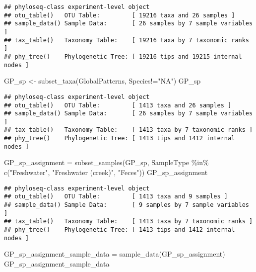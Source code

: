 \documentclass[
]{article}
\newenvironment{Shaded}{\begin{snugshade}}{\end{snugshade}}
\newcommand{\FunctionTok}[1]{\textcolor[rgb]{0.00,0.00,0.00}{#1}}
\newcommand{\NormalTok}[1]{#1}
\newcommand{\OtherTok}[1]{\textcolor[rgb]{0.56,0.35,0.01}{#1}}
\newcommand{\SpecialCharTok}[1]{\textcolor[rgb]{0.00,0.00,0.00}{#1}}
\newcommand{\StringTok}[1]{\textcolor[rgb]{0.31,0.60,0.02}{#1}}
\begin{document}
\begin{verbatim}
## phyloseq-class experiment-level object
## otu_table()   OTU Table:         [ 19216 taxa and 26 samples ]
## sample_data() Sample Data:       [ 26 samples by 7 sample variables ]
## tax_table()   Taxonomy Table:    [ 19216 taxa by 7 taxonomic ranks ]
## phy_tree()    Phylogenetic Tree: [ 19216 tips and 19215 internal nodes ]
\end{verbatim}

\begin{Shaded}
\begin{Highlighting}[]
\NormalTok{GP\_sp }\OtherTok{\textless{}{-}} \FunctionTok{subset\_taxa}\NormalTok{(GlobalPatterns, Species}\SpecialCharTok{!=}\StringTok{"NA"}\NormalTok{)}
\NormalTok{GP\_sp}
\end{Highlighting}
\end{Shaded}

\begin{verbatim}
## phyloseq-class experiment-level object
## otu_table()   OTU Table:         [ 1413 taxa and 26 samples ]
## sample_data() Sample Data:       [ 26 samples by 7 sample variables ]
## tax_table()   Taxonomy Table:    [ 1413 taxa by 7 taxonomic ranks ]
## phy_tree()    Phylogenetic Tree: [ 1413 tips and 1412 internal nodes ]
\end{verbatim}

\begin{Shaded}
\begin{Highlighting}[]
\NormalTok{GP\_sp\_assignment }\OtherTok{=} \FunctionTok{subset\_samples}\NormalTok{(GP\_sp, SampleType }\SpecialCharTok{\%in\%} \FunctionTok{c}\NormalTok{(}\StringTok{"Freshwater"}\NormalTok{, }\StringTok{"Freshwater (creek)"}\NormalTok{, }\StringTok{"Feces"}\NormalTok{))}
\NormalTok{GP\_sp\_assignment}
\end{Highlighting}
\end{Shaded}

\begin{verbatim}
## phyloseq-class experiment-level object
## otu_table()   OTU Table:         [ 1413 taxa and 9 samples ]
## sample_data() Sample Data:       [ 9 samples by 7 sample variables ]
## tax_table()   Taxonomy Table:    [ 1413 taxa by 7 taxonomic ranks ]
## phy_tree()    Phylogenetic Tree: [ 1413 tips and 1412 internal nodes ]
\end{verbatim}

\begin{Shaded}
\begin{Highlighting}[]
\NormalTok{GP\_sp\_assignment\_sample\_data }\OtherTok{=} \FunctionTok{sample\_data}\NormalTok{(GP\_sp\_assignment)}
\NormalTok{GP\_sp\_assignment\_sample\_data}
\end{Highlighting}
\end{Shaded}
\end{document}

